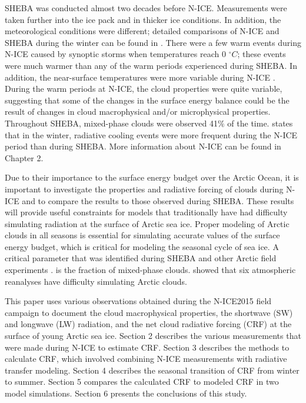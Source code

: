 SHEBA was conducted almost two decades before N-ICE. Measurements were taken further into the ice pack \citep{cohen:2017} and in thicker ice conditions. In addition, the meteorological conditions were different; detailed comparisons of N-ICE and SHEBA during the winter can be found in \citep{graham:2017}. There were a few warm events during N-ICE caused by synoptic storms when temperatures reach 0 $^{\circ}C$; these events were much warmer than any of the warm periods experienced during SHEBA. In addition, the near-surface temperatures were more variable during N-ICE \citep{cohen:2017}. During the warm periods at N-ICE, the cloud properties were quite variable, suggesting that some of the changes in the surface energy balance could be the result of changes in cloud macrophysical and/or microphysical properties. Throughout SHEBA, mixed-phase clouds were observed 41$\%$ of the time. \citet{graham:2017} states that in the winter, radiative cooling events were more frequent during the N-ICE period than during SHEBA. More information about N-ICE can be found in Chapter 2.

Due to their importance to the surface energy budget over the Arctic Ocean, it is important to investigate the properties and radiative forcing of clouds during N-ICE and to compare the results to those observed during SHEBA. These results will provide useful constraints for models that traditionally have had difficulty simulating radiation at the surface of Arctic sea ice. Proper modeling of Arctic clouds in all seasons is essential for simulating accurate values of the surface energy budget, which is critical for modeling the seasonal cycle of sea ice. A critical parameter that was identified during SHEBA \citep{inoue:2008, tjernstrom:2005} and other Arctic field experiments \citep{hines:2017, listowski:2017, hines:2019}. is the fraction of mixed-phase clouds. \citet{graham:2017} showed that six atmospheric reanalyses have difficulty simulating Arctic clouds.

This paper uses various observations obtained during the N-ICE2015 field campaign to document the cloud macrophysical properties, the shortwave (SW) and longwave (LW) radiation, and the net cloud radiative forcing (CRF) at the surface of young Arctic sea ice. Section 2 describes the various measurements that were made during N-ICE to estimate CRF. Section 3 describes the methods to calculate CRF, which involved combining N-ICE measurements with radiative transfer modeling. Section 4 describes the seasonal transition of CRF from winter to summer. Section 5 compares the calculated CRF to modeled CRF in two model simulations. Section 6 presents the conclusions of this study.

